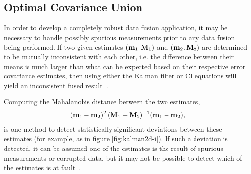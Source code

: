 \subsection{Optimal Covariance Union}\label{section:cu}

In order to develop a completely robust data fusion application, it may be necessary to handle possibly spurious
measurements prior to any data fusion being performed. If two given estimates $(\mathbf{m}_1,\mathbf{M}_1)$ and
$(\mathbf{m}_2,\mathbf{M}_2)$ are determined to be mutually inconsistent with each other, i.e. the difference between their means
is much larger than what can be expected based on their respective error covariance estimates, then using either the
Kalman filter or CI equations will yield an inconsistent fused result~\cite{uhlmann03}.

Computing the Mahalanobis distance between the two estimates,
\begin{equation}\label{eqn:mahalanobis}
(\mathbf{m}_1-\mathbf{m}_2)^T(\mathbf{M}_1+\mathbf{M}_2)^{-1}(\mathbf{m}_1-\mathbf{m}_2),
\end{equation}
is one method to detect statistically significant deviations between these estimates (for example, as in figure
\ref{fig:kalman2d-i}). If such a deviation is detected, it can be assumed one of the estimates is the result of
spurious measurements or corrupted data, but it may not be possible to detect which of the estimates is at
fault~\cite{uhlmann03}.

